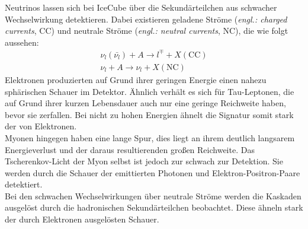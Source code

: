 Neutrinos lassen sich bei IceCube über die Sekundärteilchen aus schwacher Wechselwirkung detektieren. Dabei existieren geladene Ströme (\textit{engl.: charged currents}, CC) und neutrale Ströme (\textit{engl.: neutral currents}, NC), die wie folgt aussehen:\\
\begin{align}
	\nu_{l}(\bar{\nu_{l}}) + A \to l^{\mp} + X (\text{CC})\\
	\nu_{l} + A \to \nu_{l} + X (\text{NC})
\end{align}
Elektronen produzierten auf Grund ihrer geringen Energie einen nahezu sphärischen Schauer im Detektor. Ähnlich verhält es sich für Tau-Leptonen, die auf Grund ihrer kurzen Lebensdauer auch nur eine geringe Reichweite haben, bevor sie zerfallen. Bei nicht zu hohen Energien ähnelt die Signatur somit stark der von Elektronen. \\
Myonen hingegen haben eine lange Spur, dies liegt an ihrem deutlich langsarem Energieverlust und der daraus resultierenden großen Reichweite. Das Tscherenkov-Licht der Myon selbst ist jedoch zur schwach zur Detektion. Sie werden durch die Schauer der emittierten Photonen und Elektron-Positron-Paare detektiert.\\
Bei den schwachen Wechselwirkungen über neutrale Ströme werden die Kaskaden ausgelöst durch die hadronischen Sekundärteilchen beobachtet. Diese ähneln stark der durch Elektronen ausgelösten Schauer.

